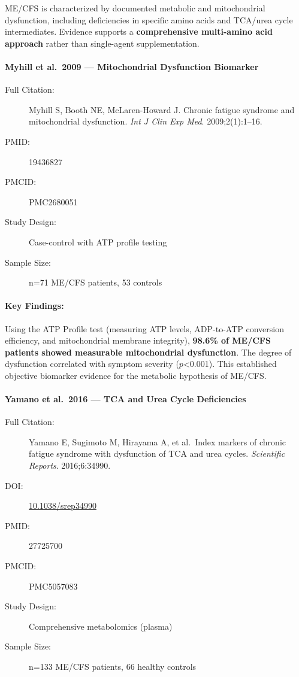 ME/CFS is characterized by documented metabolic and mitochondrial dysfunction, including deficiencies in specific amino acids and TCA/urea cycle intermediates. Evidence supports a \textbf{comprehensive multi-amino acid approach} rather than single-agent supplementation.

\paragraph{Myhill et al.\ 2009 --- Mitochondrial Dysfunction Biomarker}

\begin{description}
    \item[Full Citation:] Myhill S, Booth NE, McLaren-Howard J. Chronic fatigue syndrome and mitochondrial dysfunction. \textit{Int J Clin Exp Med}. 2009;2(1):1--16.
    \item[PMID:] 19436827
    \item[PMCID:] PMC2680051
    \item[Study Design:] Case-control with ATP profile testing
    \item[Sample Size:] n=71 ME/CFS patients, 53 controls
\end{description}

\paragraph{Key Findings:}
Using the ATP Profile test (measuring ATP levels, ADP-to-ATP conversion efficiency, and mitochondrial membrane integrity), \textbf{98.6\% of ME/CFS patients showed measurable mitochondrial dysfunction}. The degree of dysfunction correlated with symptom severity ($p$<0.001). This established objective biomarker evidence for the metabolic hypothesis of ME/CFS.

\paragraph{Yamano et al.\ 2016 --- TCA and Urea Cycle Deficiencies}

\begin{description}
    \item[Full Citation:] Yamano E, Sugimoto M, Hirayama A, et al.\ Index markers of chronic fatigue syndrome with dysfunction of TCA and urea cycles. \textit{Scientific Reports}. 2016;6:34990.
    \item[DOI:] \href{https://doi.org/10.1038/srep34990}{10.1038/srep34990}
    \item[PMID:] 27725700
    \item[PMCID:] PMC5057083
    \item[Study Design:] Comprehensive metabolomics (plasma)
    \item[Sample Size:] n=133 ME/CFS patients, 66 healthy controls
\end{description}


